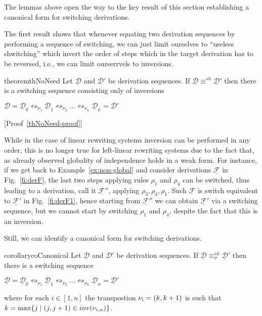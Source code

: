 \documentclass[a4paper,UKenglish,cleveref,pdftex,thm-restate,numberwithinsect,anonymous]{lipics}
\newcommand{\interval}[2][1]{\ensuremath{[{#1},{#2}]}}
\newcommand{\dder}[1]{\mathscr{#1}}
\newcommand{\der}[1]{\underline{\dder{#1}}}
\newcommand{\inv}[1]{\mathsf{inv}({#1})}
\newcommand{\shift}[1]{\ensuremath{\mathrel{{\leftrightsquigarrow}_{#1}}}}
\newcommand{\shifteq}[1][]{\ensuremath{\mathrel{{\equiv}^\mathit{sh}_{#1}}}}
\begin{document}
The lemmas above open the way to the key result of this section establishing a canonical form for
switching derivations.

The first result shows that whenever equating two derivation sequences by performing a sequence of switching, we can just limit ourselves to ``useless shwitching'' which invert the order of steps which in the target derivation has to be reversed, i.e., we can limit ourserrvels to inversions.

\begin{restatable}{theorem}{thNoNeed}
  \label{th:no-need}
  Let $\der{D}$ and $\der{D}'$ be derivation sequences. If $\der{D} \shifteq \der{D}'$ then there is a switching sequence consisting only of inversions
  \begin{center}
    $\der{D} = \der{D}_0 \shift{\nu_1} \der{D}_1 \shift{\nu_2} \ldots
    \shift{\nu_n} \der{D}_n=\der{D}'$
  \end{center}
\end{restatable}

[Proof~\ref{thNoNeed-proof}]

While in the case of linear rewriting systems inversion can be
performed in any order, this is no longer true for left-linear
rewriting systems due to the fact that, as already observed globality of independence holds in a weak form. For instance, if we get back to Example~\ref{ex:non-global} and consider derivations $\der{F}$ in Fig.~\ref{fi:derF}, the last two steps applying rules $\rho_1$ and $\rho_4$ can be switched, thus leading to a derivation, call it $\der{F}''$,  applying $\rho_3, \rho_4, \rho_1$. Such $\der{F}$ is switch equivalent to $\der{F}'$ in Fig.~\ref{fi:derF1}, hence starting from $\der{F}''$ we can obtain $\der{F}'$ via a switching sequence, but we cannot start by switching $\rho_1$ and $\rho_4$, despite the fact that this is an inversion.

Still, we can identify a
canonical form for switching derivations.


\begin{restatable}{corollary}{coCanonical}
  \label{co:canonical}
  Let $\der{D}$ and $\der{D}'$ be derivation sequences. If
  $\der{D} \shifteq[\sigma]\der{D}'$ then there is a switching sequence
  \begin{center}
    $\der{D} = \der{D}_0 \shift{\nu_1} \der{D}_1 \shift{\nu_2} \ldots
    \shift{\nu_n} \der{D}_n=\der{D}'$
  \end{center}
  where for each $i \in \interval{n}$ the transpostion $\nu_i  = \transp{k}$ is such that 
  $k = \max \{ j \mid \transp{j} \in \inv{\nu_{i,n}}\}$.
\end{restatable}
\end{document}
